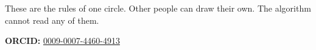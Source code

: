 \documentclass[10pt,letterpaper,twocolumn]{article}
\begin{document}
These are the rules of one circle. Other people can draw their own. The algorithm cannot read any of them.

\vspace{0.5em}
\noindent\textbf{ORCID:} \href{https://orcid.org/0009-0007-4460-4913}{0009-0007-4460-4913}



\end{document}
